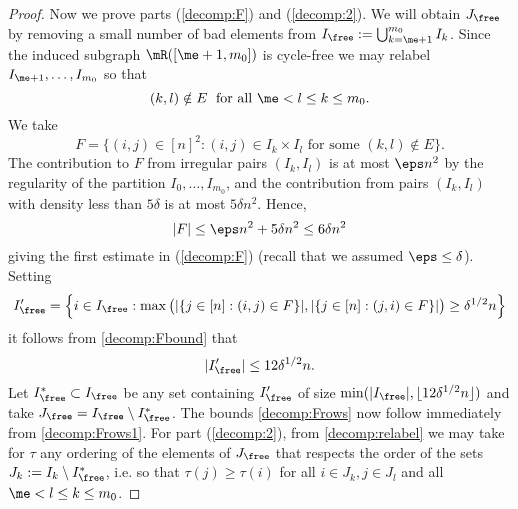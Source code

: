 \documentclass[aop,preprint]{imsart}
\theoremstyle{plain}
\theoremstyle{definition}
\theoremstyle{remark}
\numberwithin{equation}{section}
\numberwithin{theorem}{section}
\def \lf {\lfloor}
\def \rf {\rfloor}
\begin{document}
\begin{proof}
Now we prove parts (\ref{decomp:F}) and (\ref{decomp:2}). 
We will obtain $J_{\free}$ by removing a small number of bad elements from $I_{\free}:=\bigcup_{k=\me +1}^{m_0}I_k$. 
Since the induced subgraph $\mR([\me +1,m_0])$ is cycle-free we may relabel $I_{\me +1},\dots, I_{m_0}$ so that 
\begin{equation}	\label{decomp:relabel}
(k,l) \notin E\; \mbox{ for all $\me < l\le k\le m_0$}.
\end{equation}
We take
\begin{equation}
F= \big\{ (i,j)\in [n]^2: (i,j)\in I_k\times I_l  \mbox{ for some $(k,l)\notin E$}\big\}.
\end{equation}
The contribution to $F$ from irregular pairs $(I_k,I_l)$ is at most $\eps n^2$ by the regularity of the partition $I_0,\dots, I_{m_0}$, and the contribution from pairs $(I_k,I_l)$ with density less than $5\delta$ is at most $5\delta n^2$.
Hence,
\begin{equation}	\label{decomp:Fbound}
|F| \le \eps n^2+5\delta n^2 \le 6\delta n^2
\end{equation}
giving the first estimate in (\ref{decomp:F}) (recall that we assumed $\eps\le \delta$).
Setting
\begin{equation}	\label{decomp:Frows1}
I_{\free}'= \left\{ i\in I_{\free}: \max\big( |\{j\in [n]: (i,j)\in F\}|, |\{j\in [n]: (j,i)\in F\}|\big) \ge \delta^{1/2}n\right\}
\end{equation}
it follows from \eqref{decomp:Fbound} that
\begin{equation}
|I_{\free}'| \le 12\delta^{1/2}n.
\end{equation}
Let $I_{\free}^*\subset I_{\free}$ be any set containing $I_{\free}'$ of size $\min(|I_{\free}|, \lf 12 \delta^{1/2}n\rf)$ and take $J_{\free}= I_{\free}\setminus I_{\free}^*$.
The bounds \eqref{decomp:Frows} now follow immediately from \eqref{decomp:Frows1}. 
For part (\ref{decomp:2}), from \eqref{decomp:relabel} we may take for $\tau$ any ordering of the elements of $J_{\free}$ that respects the order of the sets $J_k:=I_k\setminus I_{\free}^*$, i.e. so that $\tau(j)\ge \tau(i)$ for all $i\in J_k, j\in J_l$ and all $\me <l\le k\le m_0$.


\end{proof}
\end{document}
